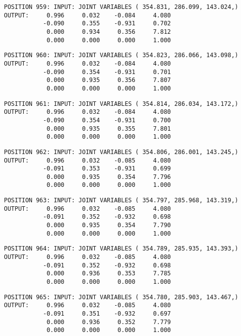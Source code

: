 \begin{verbatim}
POSITION 959: INPUT: JOINT VARIABLES ( 354.831, 286.099, 143.024,)
OUTPUT:     0.996     0.032    -0.084     4.080
           -0.090     0.355    -0.931     0.702
            0.000     0.934     0.356     7.812
            0.000     0.000     0.000     1.000
\end{verbatim} \pagebreak[1]\begin{verbatim}
POSITION 960: INPUT: JOINT VARIABLES ( 354.823, 286.066, 143.098,)
OUTPUT:     0.996     0.032    -0.084     4.080
           -0.090     0.354    -0.931     0.701
            0.000     0.935     0.356     7.807
            0.000     0.000     0.000     1.000
\end{verbatim} \pagebreak[1]\begin{verbatim}
POSITION 961: INPUT: JOINT VARIABLES ( 354.814, 286.034, 143.172,)
OUTPUT:     0.996     0.032    -0.084     4.080
           -0.090     0.354    -0.931     0.700
            0.000     0.935     0.355     7.801
            0.000     0.000     0.000     1.000
\end{verbatim} \pagebreak[1]\begin{verbatim}
POSITION 962: INPUT: JOINT VARIABLES ( 354.806, 286.001, 143.245,)
OUTPUT:     0.996     0.032    -0.085     4.080
           -0.091     0.353    -0.931     0.699
            0.000     0.935     0.354     7.796
            0.000     0.000     0.000     1.000
\end{verbatim} \pagebreak[1]\begin{verbatim}
POSITION 963: INPUT: JOINT VARIABLES ( 354.797, 285.968, 143.319,)
OUTPUT:     0.996     0.032    -0.085     4.080
           -0.091     0.352    -0.932     0.698
            0.000     0.935     0.354     7.790
            0.000     0.000     0.000     1.000
\end{verbatim} \pagebreak[1]\begin{verbatim}
POSITION 964: INPUT: JOINT VARIABLES ( 354.789, 285.935, 143.393,)
OUTPUT:     0.996     0.032    -0.085     4.080
           -0.091     0.352    -0.932     0.698
            0.000     0.936     0.353     7.785
            0.000     0.000     0.000     1.000
\end{verbatim} \pagebreak[1]\begin{verbatim}
POSITION 965: INPUT: JOINT VARIABLES ( 354.780, 285.903, 143.467,)
OUTPUT:     0.996     0.032    -0.085     4.080
           -0.091     0.351    -0.932     0.697
            0.000     0.936     0.352     7.779
            0.000     0.000     0.000     1.000
\end{verbatim} \pagebreak[1]\begin{verbatim}

\end{verbatim}
